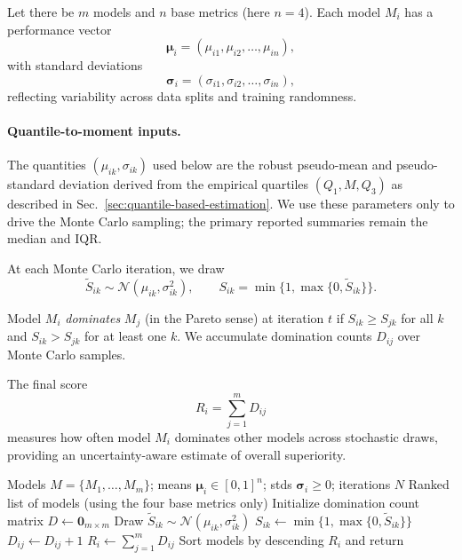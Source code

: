 Let there be $m$ models and $n$ base metrics (here $n=4$). Each model $M_i$ has a performance vector
\begin{equation}
    \boldsymbol{\mu}_i = (\mu_{i1}, \mu_{i2}, \ldots, \mu_{in}),
\end{equation}
with standard deviations
\begin{equation}
    \boldsymbol{\sigma}_i = (\sigma_{i1}, \sigma_{i2}, \ldots, \sigma_{in}),
\end{equation}
reflecting variability across data splits and training randomness.

\paragraph{Quantile-to-moment inputs.}
The quantities $(\mu_{ik},\sigma_{ik})$ used below are the robust pseudo-mean and pseudo-standard deviation derived from the empirical quartiles $(Q_1,M,Q_3)$ as described in Sec.~\ref{sec:quantile-based-estimation}. We use these parameters only to drive the Monte Carlo sampling; the primary reported summaries remain the median and IQR.

At each Monte Carlo iteration, we draw
\begin{equation}
    \tilde S_{ik} \sim \mathcal{N}(\mu_{ik}, \sigma_{ik}^2),
    \qquad
    S_{ik} = \min\{1,\max\{0,\tilde S_{ik}\}\}.
\end{equation}

Model $M_i$ \emph{dominates} $M_j$ (in the Pareto sense) at iteration $t$ if
$S_{ik} \ge S_{jk}$ for all $k$ and $S_{ik} > S_{jk}$ for at least one $k$.
We accumulate domination counts $D_{ij}$ over Monte Carlo samples.

The final score
\begin{equation}
    R_i = \sum_{j=1}^m D_{ij}
\end{equation}
measures how often model $M_i$ dominates other models across stochastic draws,
providing an uncertainty-aware estimate of overall superiority.

\begin{algorithm}[H]
\caption{Uncertainty-Aware Ranking of Generative Models}
\label{alg:ranking}
\begin{algorithmic}[1]
\Require Models $M=\{M_1,\ldots,M_m\}$; means $\boldsymbol{\mu}_i\in[0,1]^n$; stds $\boldsymbol{\sigma}_i\ge 0$; iterations $N$
\Ensure Ranked list of models (using the four base metrics only)
\State Initialize domination count matrix $D \gets \mathbf{0}_{m\times m}$
      \State Draw $\tilde S_{ik} \sim \mathcal{N}(\mu_{ik}, \sigma_{ik}^2)$
      \State $S_{ik} \gets \min\{1,\max\{0,\tilde S_{ik}\}\}$
    \EndFor
  \EndFor
        \State $D_{ij} \gets D_{ij} + 1$
      \EndIf
    \EndFor
  \EndFor
\EndFor
\State $R_i \gets \sum_{j=1}^m D_{ij}$
\State Sort models by descending $R_i$ and return
\end{algorithmic}
\end{algorithm}

